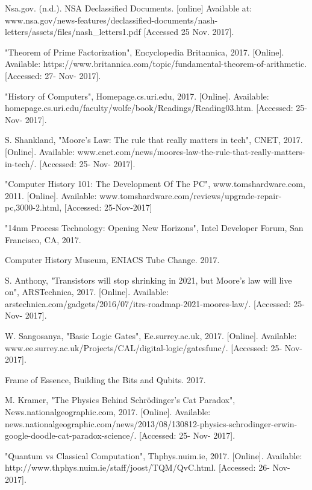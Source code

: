 \documentclass[10pt,journal,compsoc]{IEEEtran}
\begin{document}
\begin{thebibliography}{1}
	Nsa.gov. (n.d.). NSA Declassified Documents. [online] Available at: www.nsa.gov/news-features/declassified-documents/nash-letters/assets/files/nash\_letters1.pdf [Accessed 25 Nov. 2017].

	"Theorem of Prime Factorization", Encyclopedia Britannica, 2017. [Online]. Available: https://www.britannica.com/topic/fundamental-theorem-of-arithmetic. [Accessed: 27- Nov- 2017].
	
	"History of Computers", Homepage.cs.uri.edu, 2017. [Online]. Available: homepage.cs.uri.edu/faculty/wolfe/book/Readings/Reading03.htm. [Accessed: 25- Nov- 2017].
	
	
	S. Shankland, "Moore's Law: The rule that really matters in tech", CNET, 2017. [Online]. Available: www.cnet.com/news/moores-law-the-rule-that-really-matters-in-tech/. [Accessed: 25- Nov- 2017].	
	
	"Computer History 101: The Development Of The PC", www.tomshardware.com, 2011. [Online]. Available: www.tomshardware.com/reviews/upgrade-repair-pc,3000-2.html, [Accessed: 25-Nov-2017]	
	
	
	"14nm Process Technology: Opening New Horizons", Intel Developer Forum, San Francisco, CA, 2017.
	
	Computer History Museum, ENIACS Tube Change. 2017.


	S. Anthony, "Transistors will stop shrinking in 2021, but Moore’s law will live on", ARSTechnica, 2017. [Online]. Available: arstechnica.com/gadgets/2016/07/itrs-roadmap-2021-moores-law/. [Accessed: 25- Nov- 2017].

	W. Sangosanya, "Basic Logic Gates", Ee.surrey.ac.uk, 2017. [Online]. Available: www.ee.surrey.ac.uk/Projects/CAL/digital-logic/gatesfunc/. [Accessed: 25- Nov- 2017].
	
	Frame of Essence, Building the Bits and Qubits. 2017.


	M. Kramer, "The Physics Behind Schrödinger's Cat Paradox", News.nationalgeographic.com, 2017. [Online]. Available: news.nationalgeographic.com/news/2013/08/130812-physics-schrodinger-erwin-google-doodle-cat-paradox-science/. [Accessed: 25- Nov- 2017].	

	"Quantum vs Classical Computation", Thphys.nuim.ie, 2017. [Online]. Available: http://www.thphys.nuim.ie/staff/joost/TQM/QvC.html. [Accessed: 26- Nov- 2017].
	

\end{thebibliography}
\end{document}
